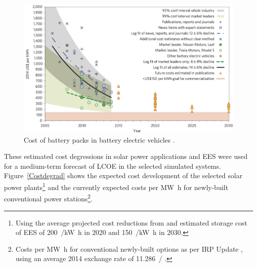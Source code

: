 \begin{figure}[htbp]  
\centering
\includegraphics[width=1\linewidth]{FIG/CostofLi-ion}
\caption[Cost of battery packs in battery electric vehicles.]{Cost of battery packs in battery electric vehicles \cite{Nykvist2015}.}\label{CostofLi-ion}
\end{figure}

These estimated cost degressions in solar power applications and EES were used for a medium-term forecast of LCOE in the selected simulated systems. Figure~\ref{Costdegrad} shows the expected cost development of the selected solar power plants\footnote{Using the average projected cost reductions from \cite{IEA2014c} and estimated storage cost of EES of \SI{200}{\usd/\kilo\watt\hour} in 2020 and \SI{150}{\usd/\kilo\watt\hour} in 2030.} and the currently expected costs per \si{\mega\watt\hour} for newly-built conventional power stations\footnote{Costs per \si{\mega\watt\hour} for conventional newly-built options as per IRP Update \cite{CSIR2015a}, using an average 2014 exchange rate of \SI{11.286}{\usd/\zar} \cite{IRS2015}.}.

